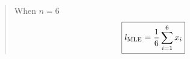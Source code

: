 \begin{quote}
    When $n=6$ $$\boxed{ l_{{\rm MLE}} = \frac{1}{6} \sum_{i=1}^6 x_i }$$
\end{quote}

